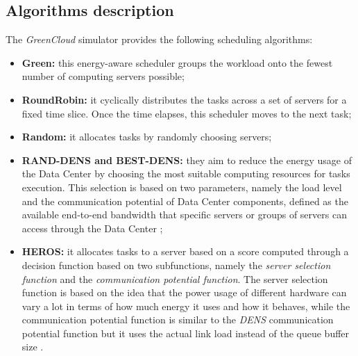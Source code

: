 \subsection{Algorithms description}
The \emph{GreenCloud} simulator provides the following scheduling algorithms: 
\begin{itemize}
    \item \textbf{Green: } this energy-aware scheduler groups the workload onto the fewest number of computing servers possible;
    \item \textbf{RoundRobin: } it cyclically distributes the tasks across a set of servers for a fixed time slice. Once the time elapses, this scheduler moves to the next task;
    \item \textbf{Random: } it allocates tasks by randomly choosing servers;
    \item \textbf{RAND-DENS and BEST-DENS: } they aim to reduce the energy usage of the Data Center by choosing the most suitable computing resources for tasks execution. This selection is based on two parameters, namely the load level and the communication potential of Data Center components, defined as the available end-to-end bandwidth that specific servers or groups of servers can access through the Data Center \cite{kliazovich2013dens};
    \item \textbf{HEROS: } it allocates tasks to a server based on a score computed through a decision function based on two subfunctions, namely the \emph{server selection function} and the \emph{communication potential function}. The server selection function is based on the idea that the power usage of different hardware can vary a lot in terms of how much energy it uses and how it behaves, while the communication potential function is similar to the \emph{DENS} communication potential function but it uses the actual link load instead of the queue buffer size \cite{guzek2015heros}.
\end{itemize}
